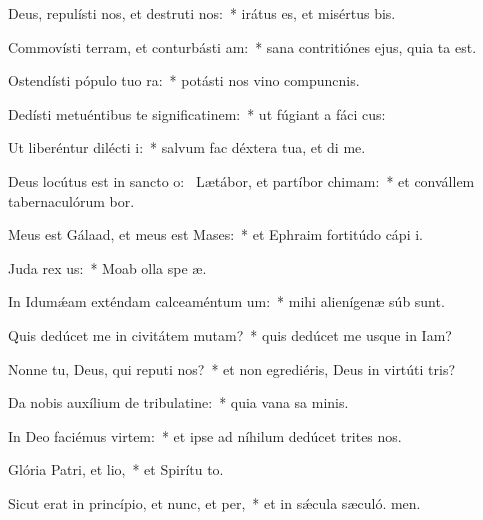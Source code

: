 \item Deus, repulísti nos, et destruti nos:~* irátus es, et misértus  bis.
\item Commovísti terram, et conturbásti am:~* sana contritiónes ejus, quia ta est.
\item Ostendísti pópulo tuo ra:~* potásti nos vino compuncnis.
\item Dedísti metuéntibus te significatinem:~* ut fúgiant a fáci cus:
\item Ut liberéntur dilécti i:~* salvum fac déxtera tua, et di me.
\item Deus locútus est in sancto o:~\pscross{} Lætábor, et partíbor chimam:~* et convállem tabernaculórum bor.
\item Meus est Gálaad, et meus est Mases:~* et Ephraim fortitúdo cápi i.
\item Juda rex us:~* Moab olla spe æ.
\item In Idumǽam exténdam calceaméntum um:~* mihi alienígenæ súb sunt.
\item Quis dedúcet me in civitátem mutam?~* quis dedúcet me usque in Iam?
\item Nonne tu, Deus, qui reputi nos?~* et non egrediéris, Deus in virtúti tris?
\item Da nobis auxílium de tribulatine:~* quia vana sa minis.
\item In Deo faciémus virtem:~* et ipse ad níhilum dedúcet trites nos.
\item Glória Patri, et lio,~* et Spirítu to.
\item Sicut erat in princípio, et nunc, et per,~* et in sǽcula sæculó. men.
